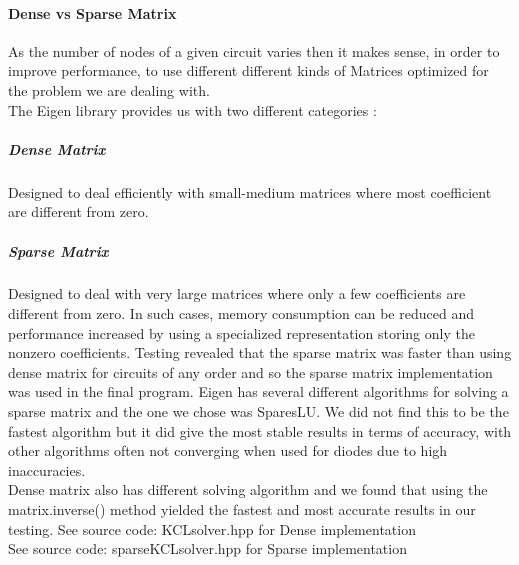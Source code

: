 \documentclass{article}
\begin{document}
\paragraph{Dense vs Sparse Matrix}
As the number of nodes of a given circuit varies then it makes sense, in order to improve performance, to use different different kinds of Matrices optimized for the problem we are dealing with. \\
The Eigen library provides us with two different categories :
\subparagraph{Dense Matrix} Designed to deal efficiently with small-medium matrices where most coefficient are different from zero.
\subparagraph{Sparse Matrix} Designed to deal with very large matrices where only a few coefficients are different from zero. In such cases, memory consumption can be reduced and performance increased by using a specialized representation storing only the nonzero coefficients.\bigbreak
Testing revealed that the sparse matrix was faster than using dense matrix for circuits of any order and so the sparse matrix implementation was used in the final program. Eigen has several different algorithms for solving a sparse matrix and the one we chose was SparesLU. We did not find this to be the fastest algorithm but it did give the most stable results in terms of accuracy, with other algorithms often not converging when used for diodes due to high inaccuracies. \\
Dense matrix also has different solving algorithm and we found that using the matrix.inverse() method yielded the fastest and most accurate results in our testing. 
\bigbreak
See source code: KCLsolver.hpp for Dense implementation \\
See source code: sparseKCLsolver.hpp for Sparse implementation
\newpage
\end{document}
